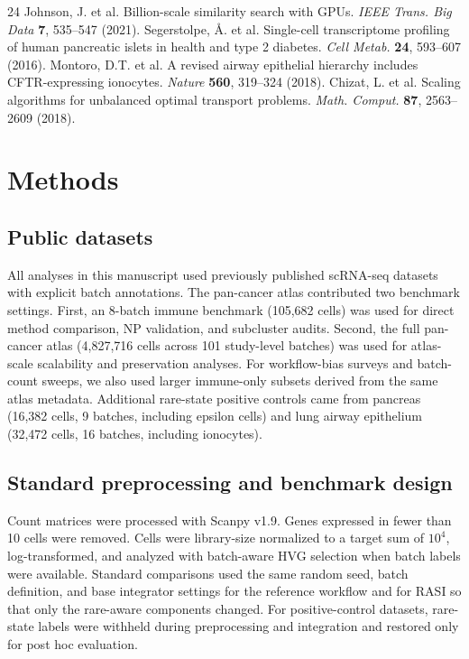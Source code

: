 \documentclass[10pt]{article}
\begin{document}
\begin{thebibliography}{24}
 Johnson, J. et al. Billion-scale similarity search with GPUs. \textit{IEEE Trans. Big Data} \textbf{7}, 535--547 (2021).
 Segerstolpe, \r{A}. et al. Single-cell transcriptome profiling of human pancreatic islets in health and type 2 diabetes. \textit{Cell Metab.} \textbf{24}, 593--607 (2016).
 Montoro, D.T. et al. A revised airway epithelial hierarchy includes CFTR-expressing ionocytes. \textit{Nature} \textbf{560}, 319--324 (2018).
 Chizat, L. et al. Scaling algorithms for unbalanced optimal transport problems. \textit{Math. Comput.} \textbf{87}, 2563--2609 (2018).
\end{thebibliography}

\section*{Methods}

\subsection*{Public datasets}

All analyses in this manuscript used previously published scRNA-seq datasets with explicit batch annotations. The pan-cancer atlas contributed two benchmark settings.\cite{kang2024} First, an 8-batch immune benchmark (105,682 cells) was used for direct method comparison, NP validation, and subcluster audits. Second, the full pan-cancer atlas (4,827,716 cells across 101 study-level batches) was used for atlas-scale scalability and preservation analyses. For workflow-bias surveys and batch-count sweeps, we also used larger immune-only subsets derived from the same atlas metadata. Additional rare-state positive controls came from pancreas (16,382 cells, 9 batches, including epsilon cells)\cite{segerstolpe2016} and lung airway epithelium (32,472 cells, 16 batches, including ionocytes).\cite{montoro2018}

\subsection*{Standard preprocessing and benchmark design}

Count matrices were processed with Scanpy v1.9.\cite{wolf2018} Genes expressed in fewer than 10 cells were removed. Cells were library-size normalized to a target sum of $10^4$, log-transformed, and analyzed with batch-aware HVG selection when batch labels were available. Standard comparisons used the same random seed, batch definition, and base integrator settings for the reference workflow and for RASI so that only the rare-aware components changed. For positive-control datasets, rare-state labels were withheld during preprocessing and integration and restored only for post hoc evaluation.
\end{document}
